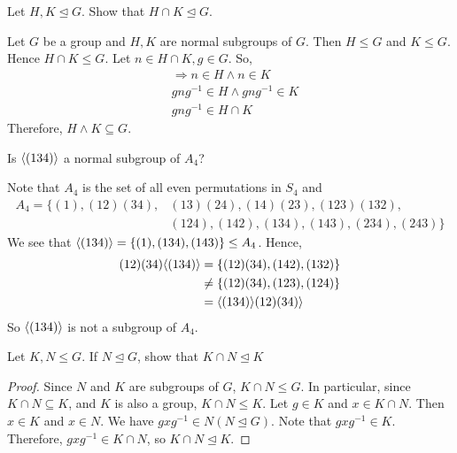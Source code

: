 \begin{exercise}
    Let $H, K \unlhd G$. Show that $H \cap K \unlhd G$.
\end{exercise}

\begin{solution}
    Let $G$ be a group and $H, K$ are normal subgroups of $G$. Then $H \leq G$ and $K \leq G$. Hence $H \cap K \leq G$. Let $n \in H \cap K, g \in G$. So,
    \begin{align*}
        & \Rightarrow n \in H \land  n \in K \\
        & gng^{-1} \in H \land gng^{-1} \in K \\
        & gng^{-1} \in H \cap K
    \end{align*}
    Therefore, $H \land K \subseteq G$. \qedsymbol
\end{solution}

\begin{exercise}
    Is $\langle \qty(134) \rangle$ a normal subgroup of $A_4$?
\end{exercise}

\begin{solution}
    Note that $A_4$ is the set of all even permutations in $S_4$ and 
    \begin{equation*}
        \begin{split}
            A_4 = \{(1), (12)(34), &(13)(24), (14)(23), (123)(132),  \\
            &(124), (142), (134), (143), (234), (243) \}
        \end{split}
    \end{equation*}
    We see that $\langle (134) \rangle = \qty{(1), (134), (143)} \leq A_4$. Hence,
    \begin{align*}
        (12)(34) \langle (134) \rangle &= \qty{(12)(34), (142), (132)} \\
        &\neq \qty{(12)(34), (123), (124)} \\
        &= \langle (134) \rangle (12)(34) \rangle
    \end{align*}
    So $\langle \qty(134) \rangle$ is not a subgroup of $A_4$. \qedsymbol
\end{solution}

\begin{exercise}
    Let $K, N \leq G$. If $N \unlhd G$, show that $K \cap N \unlhd K$
\end{exercise}

\begin{proof}
    Since $N$ and $K$ are subgroups of $G$, $K \cap N \leq G$. In particular, since $K \cap N \subseteq K$, and $K$ is also a group, $K \cap N \leq K$. Let $g \in K$ and $x \in K \cap N$. Then $x \in K$ and $x \in N$. We have $gxg^{-1} \in N (N \unlhd G)$. Note that $gxg^{-1} \in K$. Therefore, $gxg^{-1} \in K \cap N$, so $K \cap N \unlhd K$. \qedsymbol
\end{proof}

